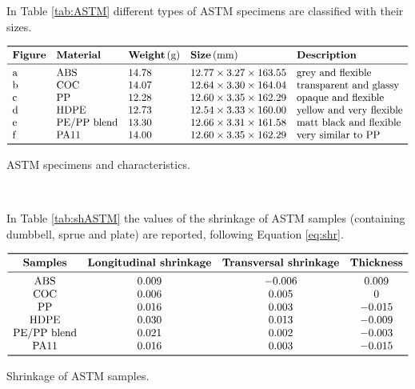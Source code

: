 \documentclass[a4paper, 11pt]{article}
\begin{document}
In Table \ref{tab:ASTM} different types of ASTM specimens are classified with their sizes.
\begin{table}[htp]
\centering
$
\begin{array}{lllll}
\toprule
\textbf{Figure} & \textbf{Material} & \textbf{Weight}\,(\text{g}) & \textbf{Size}\,(\text{mm}) & \textbf{Description} \\
\midrule
\text{a} & \text{ABS} & 14.78 & 12.77\times 3.27\times 163.55 & \text{grey and flexible}\\
\text{b} & \text{COC} & 14.07 & 12.64\times 3.30\times 164.04 & \text{transparent and glassy}\\
\text{c} & \text{PP} & 12.28 & 12.60\times 3.35\times 162.29 & \text{opaque and flexible} \\
\text{d} & \text{HDPE} & 12.73 & 12.54\times 3.33\times 160.00 & \text{yellow and very flexible} \\
\text{e} & \text{PE/PP}\ \text{blend} & 13.30 & 12.66\times 3.31\times 161.58 & \text{matt black and flexible} \\
\text{f} & \text{PA11} & 14.00 & 12.60\times 3.35\times 162.29 & \text{very similar to PP} \\
\bottomrule
\end{array}
$
\caption{ASTM specimens and characteristics.}
\label{tab:ASTM}
\end{table}
\\

\newpage

In Table \ref{tab:shASTM} the values of the shrinkage of ASTM samples (containing dumbbell, sprue and plate) are reported, following Equation \ref{eq:shr}.

\begin{table}[htp]
\centering
$
\begin{array}{cccc}
\toprule
\textbf{Samples} & \textbf{Longitudinal shrinkage} & \textbf{Transversal shrinkage} & \textbf{Thickness} \\
\midrule
\text{ABS} & 0.009 & -0.006 & 0.009  \\
\text{COC} & 0.006 & 0.005 & 0 \\
\text{PP} & 0.016 & 0.003& -0.015 \\
\text{HDPE} & 0.030 & 0.013 & -0.009 \\
\text{PE/PP blend} & 0.021 & 0.002 & -0.003 \\
\text{PA11} & 0.016 & 0.003& -0.015 \\
\bottomrule
\end{array}
$
\caption{Shrinkage of ASTM samples.}
\label{tab:shASTM}
\end{table}
\end{document}
